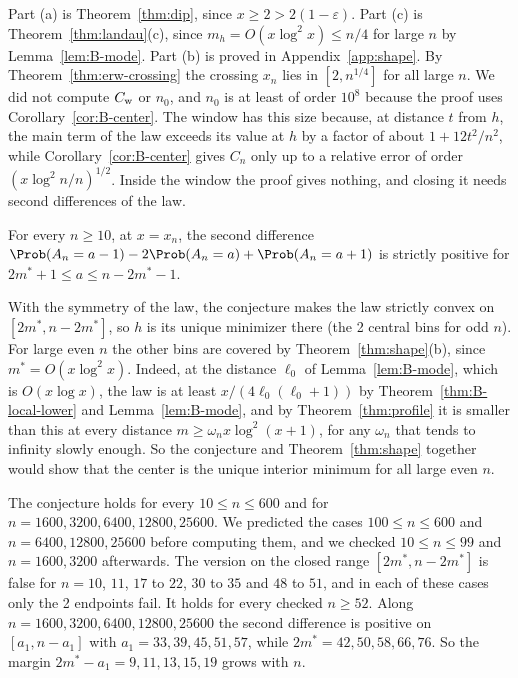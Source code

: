 Part (a) is Theorem~\ref{thm:dip}, since $x\ge2>2(1-\varepsilon)$. Part (c)
is Theorem~\ref{thm:landau}(c), since $m_h=O(x\log^2x)\le n/4$ for large $n$
by Lemma~\ref{lem:B-mode}. Part (b) is proved in Appendix~\ref{app:shape}.
By Theorem~\ref{thm:erw-crossing} the crossing $x_n$ lies in $[2,n^{1/4}]$
for all large $n$. We did not compute $C_{\rm w}$ or $n_0$, and $n_0$ is at least
of order $10^8$ because the proof uses Corollary~\ref{cor:B-center}. The
window has this size because, at distance $t$ from $h$, the main term of
the law exceeds its value at $h$ by a factor of about $1+12t^2/n^2$, while
Corollary~\ref{cor:B-center} gives $C_n$ only up to a relative error of
order $(x\log^2n/n)^{1/2}$. Inside the window the proof gives nothing, and
closing it needs second differences of the law.

\begin{conjecture}\label{conj:convex}
For every $n\ge10$, at $x=x_n$, the second difference
$\Prob(A_n=a-1)-2\Prob(A_n=a)+\Prob(A_n=a+1)$ is strictly positive for
$2m^*+1\le a\le n-2m^*-1$.
\end{conjecture}

With the symmetry of the law, the conjecture makes the law strictly convex
on $[2m^*,n-2m^*]$, so $h$ is its unique minimizer there (the 2 central bins
for odd $n$). For large even $n$ the other bins are covered by
Theorem~\ref{thm:shape}(b), since $m^*=O(x\log^2x)$. Indeed, at the
distance $\ell_0$ of Lemma~\ref{lem:B-mode}, which is $O(x\log x)$, the law
is at least $x/(4\ell_0(\ell_0+1))$ by Theorem~\ref{thm:B-local-lower} and
Lemma~\ref{lem:B-mode}, and by Theorem~\ref{thm:profile} it is smaller than
this at every distance $m\ge\omega_nx\log^2(x+1)$, for any $\omega_n$ that
tends to infinity slowly enough. So the conjecture and
Theorem~\ref{thm:shape} together would show that the center is the unique
interior minimum for all large even $n$.

The conjecture holds for every $10\le n\le600$ and for
$n=1600,3200,6400,12800,25600$. We predicted the cases $100\le n\le600$ and
$n=6400,12800,25600$ before computing them, and we checked $10\le n\le99$
and $n=1600,3200$ afterwards. The version on the closed range
$[2m^*,n-2m^*]$ is false for $n=10$, $11$, $17$ to $22$, $30$ to $35$ and
$48$ to $51$, and in each of these cases only the 2 endpoints fail. It holds
for every checked $n\ge52$. Along $n=1600,3200,6400,12800,25600$ the second
difference is positive on $[a_1,n-a_1]$ with $a_1=33,39,45,51,57$, while
$2m^*=42,50,58,66,76$. So the margin $2m^*-a_1=9,11,13,15,19$ grows with
$n$.

